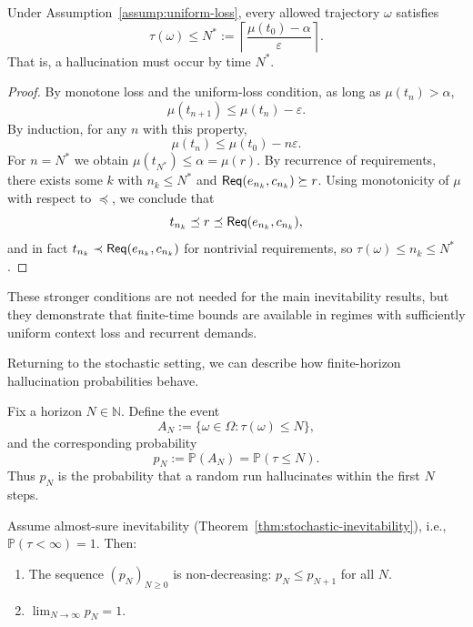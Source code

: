 \begin{lemma}
\label{lem:finite-time-bound}
Under Assumption~\ref{assump:uniform-loss}, every allowed trajectory
\(\omega\) satisfies
\[
\tau(\omega)
 \le
N^\ast
 :=
\left\lceil \frac{\mu(t_0) - \alpha}{\varepsilon} \right\rceil.
\]
That is, a hallucination must occur by time \(N^\ast\).
\end{lemma}

\begin{proof}
By monotone loss and the uniform-loss condition, as long as
\(\mu(t_n)>\alpha\),
\[
\mu(t_{n+1}) \le \mu(t_n) - \varepsilon.
\]
By induction, for any \(n\) with this property,
\[
\mu(t_n) \le \mu(t_0) - n\varepsilon.
\]
For \(n = N^\ast\) we obtain \(\mu(t_{N^\ast}) \le \alpha =
\mu(r)\). By recurrence of requirements, there exists some \(k\) with
\(n_k \le N^\ast\) and \(\mathsf{Req}(e_{n_k},c_{n_k}) \succeq r\). Using
monotonicity of \(\mu\) with respect to \(\preceq\), we conclude that
\[
t_{n_k} \preceq r \preceq \mathsf{Req}(e_{n_k},c_{n_k}),
\]
and in fact \(t_{n_k} \prec \mathsf{Req}(e_{n_k},c_{n_k})\) for nontrivial
requirements, so \(\tau(\omega)\le n_k \le N^\ast\).
\end{proof}

These stronger conditions are not needed for the main inevitability
results, but they demonstrate that finite-time bounds are available in
regimes with sufficiently uniform context loss and recurrent demands.


Returning to the stochastic setting, we can describe how
finite-horizon hallucination probabilities behave.

\begin{definition}
Fix a horizon \(N\in\mathbb{N}\). Define the event
\[
A_N := \{\omega\in\Omega : \tau(\omega) \le N\},
\]
and the corresponding probability
\[
p_N := \mathbb{P}(A_N)
     = \mathbb{P}(\tau \le N).
\]
Thus \(p_N\) is the probability that a random run hallucinates within
the first \(N\) steps.
\end{definition}

\begin{proposition}
Assume almost-sure inevitability
(Theorem~\ref{thm:stochastic-inevitability}), i.e.,
\(\mathbb{P}(\tau<\infty)=1\). Then:
\begin{enumerate}
  \item The sequence \((p_N)_{N\ge 0}\) is non-decreasing:
        \(p_N \le p_{N+1}\) for all \(N\).
  \item \(\displaystyle \lim_{N\to\infty} p_N = 1\).
\end{enumerate}
\end{proposition}


